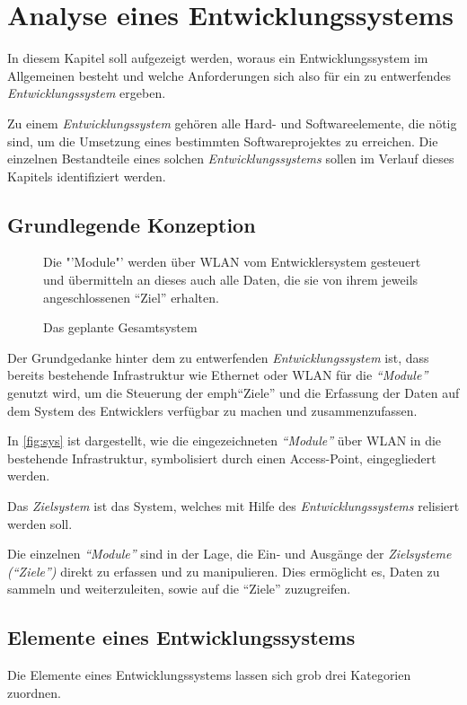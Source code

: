 \chapter{Analyse eines Entwicklungssystems}\label{chap:analyse}
\minitoc
In diesem Kapitel soll aufgezeigt werden, woraus ein Entwicklungssystem
im Allgemeinen besteht und welche Anforderungen sich also für ein zu
entwerfendes \emph{Entwicklungssystem} ergeben.
\begin{definition}[Entwicklungssystem]
Zu einem \emph{Entwicklungssystem} gehören
alle Hard- und Softwareelemente, die nötig sind, um die Umsetzung eines
bestimmten Softwareprojektes zu erreichen. Die einzelnen Bestandteile eines
solchen \emph{Entwicklungssystems} sollen im Verlauf dieses Kapitels
identifiziert werden.
\end{definition}
\section{Grundlegende Konzeption}
\begin{figure}[!ht]
\centering
\def\svgwidth{\columnwidth}

\caption{Das geplante Gesamtsystem}{Die "'Module"' werden über WLAN
vom Entwicklersystem gesteuert und übermitteln an dieses auch alle
Daten, die sie von ihrem jeweils angeschlossenen "`Ziel"' erhalten.}
\label{fig:sys}
\end{figure}
Der Grundgedanke hinter dem zu entwerfenden \emph{Entwicklungssystem} ist, dass
bereits bestehende Infrastruktur wie Ethernet oder WLAN für die \emph{"`Module"'}
genutzt wird, um die Steuerung der emph{"`Ziele"'} und die Erfassung der Daten auf
dem System des Entwicklers verfügbar zu machen und zusammenzufassen.

In \autoref{fig:sys} ist dargestellt, wie die eingezeichneten \emph{"`Module"'}
über WLAN in die bestehende Infrastruktur, symbolisiert durch einen
Access-Point, eingegliedert werden.
\begin{definition}[Zielsystem]
Das \emph{Zielsystem} ist das System, welches mit Hilfe des
\emph{Entwicklungssystems} relisiert werden soll.
\end{definition}
Die einzelnen \emph{"`Module"'} sind in der Lage, die Ein- und Ausgänge
der \emph{Zielsysteme ("`Ziele"')} direkt zu erfassen und zu manipulieren. Dies
ermöglicht es, Daten zu sammeln und weiterzuleiten, sowie auf die "`Ziele"'
zuzugreifen.

\section{Elemente eines Entwicklungssystems}
Die Elemente eines Entwicklungssystems lassen sich grob drei Kategorien
zuordnen. 

